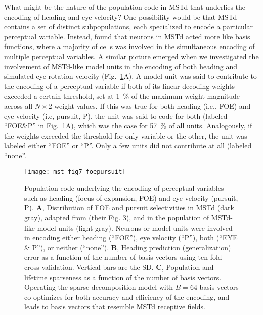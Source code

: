 What might be the nature of the population code in \ac{MSTd} that underlies
the encoding of heading and eye velocity? One possibility would be that 
\ac{MSTd} contains a set of distinct subpopulations, each specialized to 
encode a particular perceptual variable. Instead, \cite{BenHamed2003}
found that neurons in \ac{MSTd} acted more like basis functions, where a 
majority of cells was involved in the simultaneous encoding of multiple 
perceptual variables. A similar picture emerged when we investigated the
involvement of \ac{MSTd}-like model units in the encoding of both heading
and simulated eye rotation velocity (Fig.~\ref{fig:MSTd|FOE}A). 
A model unit was said to contribute to the encoding of a perceptual variable 
if both of its linear decoding weights exceeded a certain threshold, set at
\SI{1}{\percent} of the maximum weight magnitude across all $N \times 2$
weight values. If this was true for both heading (i.e., \ac{FOE}) and eye 
velocity (i.e, pursuit, P), the unit was said to code for both (labeled 
``FOE\&P'' in Fig.~\ref{fig:MSTd|FOE}A), which was the case for 
\SI{57}{\percent} of all units. Analogously, if the weights exceeded the 
threshold for only variable or the other, the unit was labeled either 
``FOE'' or ``P''. Only a few units did not contribute at all (labeled 
``none''.

\begin{figure}[t]
  \centering
  \texttt{[image: mst\_fig7\_foepursuit]}
  \caption{
  Population code underlying the encoding of perceptual variables such as 
  heading (focus of expansion, \ac{FOE}) and eye velocity (pursuit, P). 
  \textbf{A}, Distribution of \ac{FOE} and pursuit selectivities in \ac{MSTd}
  (dark gray), adapted from \cite{BenHamed2003} (their Fig. 3), and in the
  population of \ac{MSTd}-like model units (light gray). 
  Neurons or model units were involved in encoding either heading (``FOE''), 
  eye velocity (``P''), both (``EYE \& P''), or neither (``none''). 
  \textbf{B}, Heading prediction (generalization) error as a function of 
  the number of basis vectors using ten-fold cross-validation. Vertical bars 
  are the SD. 
  \textbf{C}, Population and lifetime sparseness as a function of the number 
  of basis vectors. Operating the sparse decomposition model with $B=64$
  basis vectors co-optimizes for both accuracy and efficiency of the encoding, 
  and leads to basis vectors that resemble \ac{MSTd} receptive fields.}
  \label{fig:MSTd|FOE}
\end{figure}

